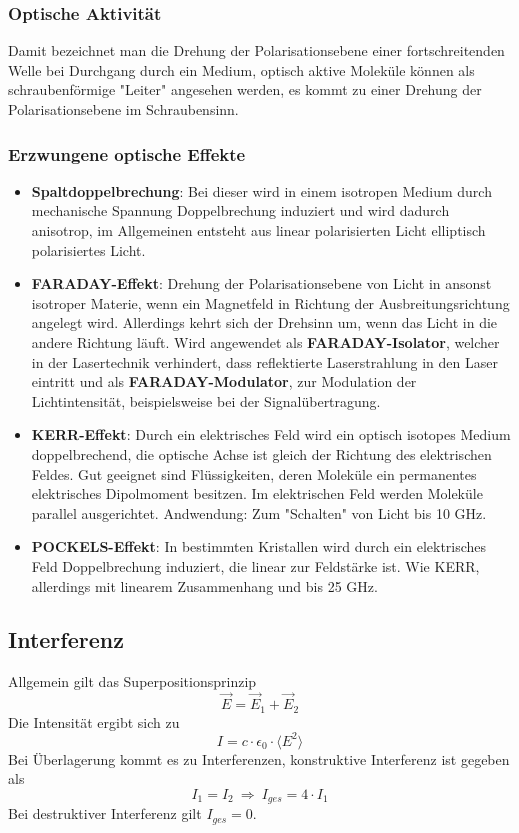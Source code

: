 \documentclass[12pt,a4paper,ngerman]{article}
\begin{document}
\subsubsection{Optische Aktivität}
Damit bezeichnet man die Drehung der Polarisationsebene einer fortschreitenden Welle bei Durchgang durch ein Medium, optisch aktive Moleküle können als schraubenförmige "Leiter" angesehen werden, es kommt zu einer Drehung der Polarisationsebene im Schraubensinn. 

\subsubsection{Erzwungene optische Effekte}
\begin{itemize}
\item \textbf{Spaltdoppelbrechung}: Bei dieser wird in einem isotropen Medium durch mechanische Spannung Doppelbrechung induziert und wird dadurch anisotrop, im Allgemeinen entsteht aus linear polarisierten Licht elliptisch polarisiertes Licht. 
\item \textbf{FARADAY-Effekt}: Drehung der Polarisationsebene von Licht in ansonst isotroper Materie, wenn ein Magnetfeld in Richtung der Ausbreitungsrichtung angelegt wird. Allerdings kehrt sich der Drehsinn um, wenn das Licht in die andere Richtung läuft. Wird angewendet als \textbf{FARADAY-Isolator}, welcher in der Lasertechnik verhindert, dass reflektierte Laserstrahlung in den Laser eintritt und als \textbf{FARADAY-Modulator}, zur Modulation der Lichtintensität, beispielsweise bei der Signalübertragung. 
\item \textbf{KERR-Effekt}: Durch ein elektrisches Feld wird ein optisch isotopes Medium doppelbrechend, die optische Achse ist gleich der Richtung des elektrischen Feldes. Gut geeignet sind Flüssigkeiten, deren Moleküle ein permanentes elektrisches Dipolmoment besitzen. Im elektrischen Feld werden Moleküle parallel ausgerichtet. Andwendung: Zum "Schalten" von Licht bis 10 GHz.
\item \textbf{POCKELS-Effekt}: In bestimmten Kristallen wird durch ein elektrisches Feld Doppelbrechung induziert, die linear zur Feldstärke ist. Wie KERR, allerdings mit linearem Zusammenhang und bis 25 GHz. 
\end{itemize}

\subsection{Interferenz}
Allgemein gilt das Superpositionsprinzip
\begin{equation}
\vec{E} = \vec{E}_1 + \vec{E}_2
\end{equation}
Die Intensität ergibt sich zu 
\begin{equation}
I = c \cdot \epsilon_0 \cdot \langle E^2 \rangle
\end{equation}
Bei Überlagerung kommt es zu Interferenzen, konstruktive Interferenz ist gegeben als
\begin{equation}
I_1 = I_2 \ \Rightarrow \ I_{ges} = 4 \cdot I_1
\end{equation}
Bei destruktiver Interferenz gilt $I_{ges} = 0$. 
\end{document}
